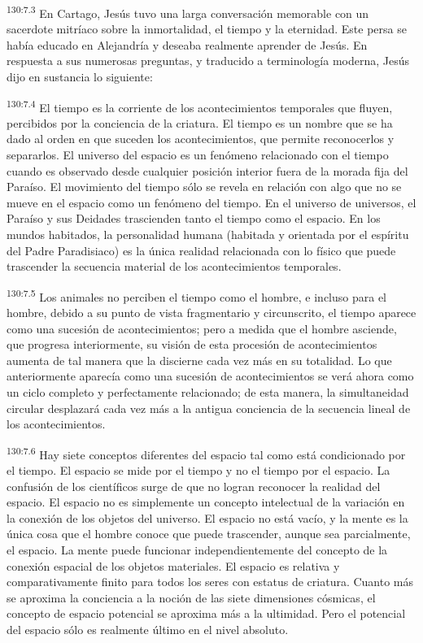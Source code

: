 \par 
\textsuperscript{130:7.3} En Cartago, Jesús tuvo una larga conversación memorable con un sacerdote mitríaco sobre la inmortalidad, el tiempo y la eternidad. Este persa se había educado en Alejandría y deseaba realmente aprender de Jesús. En respuesta a sus numerosas preguntas, y traducido a terminología moderna, Jesús dijo en sustancia lo siguiente:

\par 
\textsuperscript{130:7.4} El tiempo es la corriente de los acontecimientos temporales que fluyen, percibidos por la conciencia de la criatura. El tiempo es un nombre que se ha dado al orden en que suceden los acontecimientos, que permite reconocerlos y separarlos. El universo del espacio es un fenómeno relacionado con el tiempo cuando es observado desde cualquier posición interior fuera de la morada fija del Paraíso. El movimiento del tiempo sólo se revela en relación con algo que no se mueve en el espacio como un fenómeno del tiempo. En el universo de universos, el Paraíso y sus Deidades trascienden tanto el tiempo como el espacio. En los mundos habitados, la personalidad humana (habitada y orientada por el espíritu del Padre Paradisiaco) es la única realidad relacionada con lo físico que puede trascender la secuencia material de los acontecimientos temporales.

\par 
\textsuperscript{130:7.5} Los animales no perciben el tiempo como el hombre, e incluso para el hombre, debido a su punto de vista fragmentario y circunscrito, el tiempo aparece como una sucesión de acontecimientos; pero a medida que el hombre asciende, que progresa interiormente, su visión de esta procesión de acontecimientos aumenta de tal manera que la discierne cada vez más en su totalidad. Lo que anteriormente aparecía como una sucesión de acontecimientos se verá ahora como un ciclo completo y perfectamente relacionado; de esta manera, la simultaneidad circular desplazará cada vez más a la antigua conciencia de la secuencia lineal de los acontecimientos.

\par 
\textsuperscript{130:7.6} Hay siete conceptos diferentes del espacio tal como está condicionado por el tiempo. El espacio se mide por el tiempo y no el tiempo por el espacio. La confusión de los científicos surge de que no logran reconocer la realidad del espacio. El espacio no es simplemente un concepto intelectual de la variación en la conexión de los objetos del universo. El espacio no está vacío, y la mente es la única cosa que el hombre conoce que puede trascender, aunque sea parcialmente, el espacio. La mente puede funcionar independientemente del concepto de la conexión espacial de los objetos materiales. El espacio es relativa y comparativamente finito para todos los seres con estatus de criatura. Cuanto más se aproxima la conciencia a la noción de las siete dimensiones cósmicas, el concepto de espacio potencial se aproxima más a la ultimidad. Pero el potencial del espacio sólo es realmente último en el nivel absoluto.

